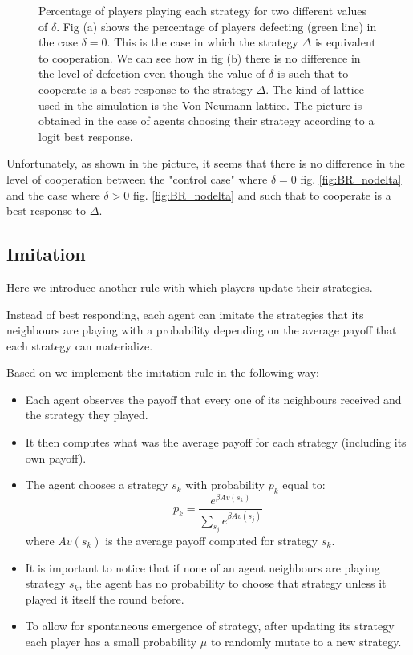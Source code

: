 \documentclass{article}
\begin{document}
\begin{figure}[htbp]
\begin{subfigure}[t]{0.47\textwidth}
  \label{fig:BR_delta} 
\end{subfigure}
\caption{Percentage of players playing each strategy for two different values of $\delta$.
Fig (a) shows the percentage of players defecting (green line) in the case $\delta =0$. This is the case in which the strategy $\Delta$ is equivalent to cooperation.
We can see how in fig (b) there is no difference in the level of defection even though the value of $\delta$ is such that to cooperate is a best response to the strategy $\Delta$.
The kind of lattice used in the simulation is the Von Neumann lattice.
The picture is obtained in the case of agents choosing their strategy according to a logit best response.
}
\label{fig:BR}
\end{figure} 

Unfortunately, as shown in the picture, it seems that there is no difference in the level of cooperation between the "control case" where $\delta=0$ fig. \ref{fig:BR_nodelta} and the case where $\delta>0$  fig. \ref{fig:BR_nodelta} and such that to cooperate is a best response to $\Delta$.

\subsection{Imitation}
Here we introduce another rule with which players update their strategies.

Instead of best responding, each agent can imitate the strategies that its neighbours are playing with a probability depending on the average payoff that each strategy can materialize.

Based on \cite{Eshel1998} we implement the  imitation rule in the following way:
\begin{itemize}
\item Each agent observes the payoff that every one of its neighbours received and the strategy they played.

\item It then computes what was the average payoff for each strategy (including its own payoff).

\item The agent chooses a strategy $s_k$ with probability $p_k$ equal to:
$$
p_{k}=\frac{e^{\beta Av\left(s_{k}\right)}}{\sum_{s_{j}}e^{\beta Av\left(s_{j}\right)}}
$$
where $Av\left(s_{k}\right)$ is the average payoff computed for strategy $s_k$.

\item It is important to notice that if none of an agent neighbours are playing strategy $s_k$, the agent has no probability to choose that strategy unless it played it itself the round before.

\item To allow for spontaneous emergence of strategy, after updating its strategy each player has a small probability $\mu$ to randomly mutate to a new strategy.
\end{itemize}
\end{document}
